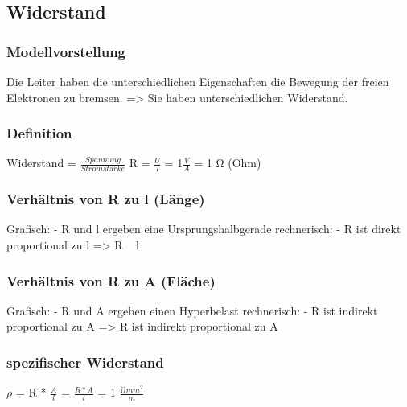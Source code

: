 \documentclass[../../main.tex]{subfiles}
\begin{document}
\subsection{Widerstand}

\subsubsection{Modellvorstellung}
Die Leiter haben die unterschiedlichen Eigenschaften die Bewegung der freien Elektronen zu bremsen.
=> Sie haben unterschiedlichen Widerstand.

\subsubsection{Definition}
Widerstand = $\frac{Spannung}{Stromstärke}$ \newline
R = $\frac{U}{I}$ \newline
[R] = 1$\frac{V}{A}$ = 1 \si{\ohm} (Ohm) \newline

\subsubsection{Verhältnis von R zu l (Länge)}
Grafisch: \newline
    - R und l ergeben eine Ursprungshalbgerade \newline
rechnerisch: \newline
    - R ist direkt proportional zu l \newline
=> R ~ l

\subsubsection{Verhältnis von R zu A (Fläche)}
Grafisch: \newline
    - R und A ergeben einen Hyperbelast \newline
rechnerisch: \newline
    - R ist indirekt proportional zu A \newline
=> R ist indirekt proportional zu A

\subsubsection{spezifischer Widerstand}
$\si{\rho}$ = R * $\frac{A}{l}$ = $\frac{R * A}{l}$ \newline
[$\si{\rho}$] = 1 $\frac{\si{\ohm}{mm^2}}{m}$
\end{document}
